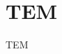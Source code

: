 \documentclass[\main/dresen_thesis.tex]{subfiles}
\begin{document}
  \section{TEM}
    \label{app:methods:tem}
    TEM
\end{document}
